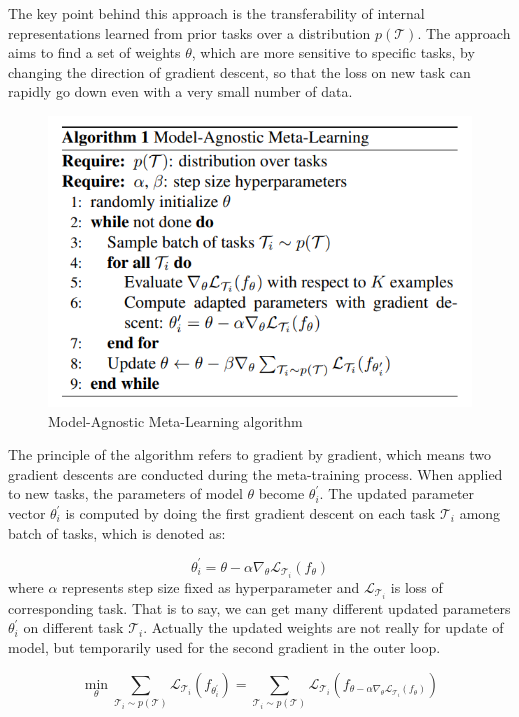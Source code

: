 The key point behind this approach is the transferability of internal representations learned from prior tasks over a distribution $p(\mathcal{T})$. The approach aims to find a set of weights $\theta$, which are more sensitive to specific tasks, by changing the direction of gradient descent, so that the loss on new task can rapidly go down even with a very small number of data.  

\begin{figure}[H]
	\includegraphics[scale=0.65]{MAML_02.PNG}
	\centering
	\caption{Model-Agnostic Meta-Learning algorithm}
	\label{MAML}
\end{figure}

The principle of the algorithm refers to gradient by gradient, which means two gradient descents are conducted during the meta-training process. When applied to new tasks, the parameters of model $\theta$ become $\theta_{i}^{\prime}$. The updated parameter vector $\theta_{i}^{\prime}$ is computed by doing the first gradient descent on each task $\mathcal{T}_{i}$ among batch of tasks, which is denoted as:

$$\theta_{i}^{\prime}=\theta-\alpha \nabla_{\theta} \mathcal{L}_{\mathcal{T}_{i}}\left(f_{\theta}\right)$$
where $\alpha$ represents step size fixed as hyperparameter and $\mathcal{L}_{\mathcal{T}_{i}}$ is loss of corresponding task.
That is to say, we can get many different updated parameters $\theta_{i}^{\prime}$ on different task $\mathcal{T}_{i}$. Actually the updated weights are not really for update of model, but temporarily used for the second gradient in the outer loop. 

$$
\min _{\theta} \sum_{\mathcal{T}_{i} \sim p(\mathcal{T})} \mathcal{L}_{\mathcal{T}_{i}}\left(f_{\theta_{i}^{\prime}}\right)=\sum_{\mathcal{T}_{i} \sim p(\mathcal{T})} \mathcal{L}_{\mathcal{T}_{i}}\left(f_{\theta-\alpha \nabla_{\theta} \mathcal{L}_{\mathcal{T}_{i}}\left(f_{\theta}\right)}\right)
$$


